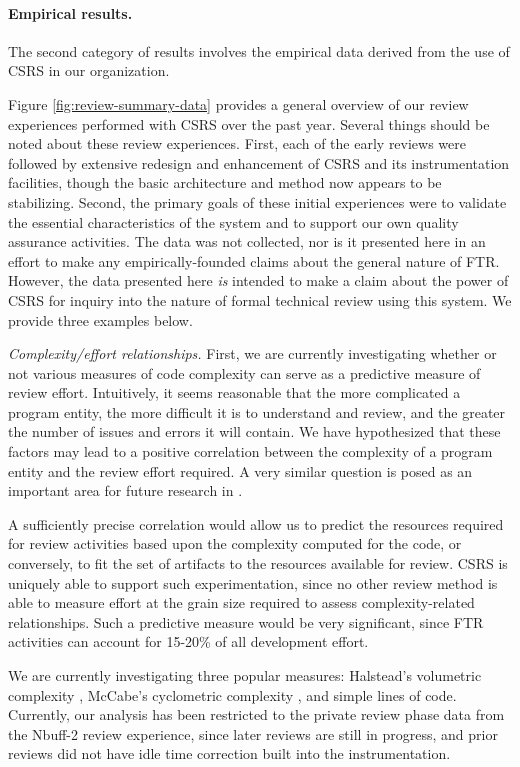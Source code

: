 \paragraph {Empirical results.}

The second category of results involves the empirical data derived from the
use of CSRS in our organization.  

Figure \ref{fig:review-summary-data} provides a general overview of our
review experiences performed with CSRS over the past year. Several things
should be noted about these review experiences. First, each of the early
reviews were followed by extensive redesign and enhancement of CSRS and its
instrumentation facilities, though the basic architecture and method now
appears to be stabilizing.  Second, the primary goals of these initial
experiences were to validate the essential characteristics of the system
and to support our own quality assurance activities.  The data was not
collected, nor is it presented here in an effort to make any
empirically-founded claims about the general nature of FTR.  However, the
data presented here {\em is}\/ intended to make a claim about the power of
CSRS for inquiry into the nature of formal technical review using this
system. We provide three examples below.

{\sl Complexity/effort relationships.} First, we are currently
investigating whether or not various measures of code complexity can serve
as a predictive measure of review effort.  Intuitively, it seems reasonable
that the more complicated a program entity, the more difficult it is to
understand and review, and the greater the number of issues and errors it
will contain.  We have hypothesized that these factors may lead to a
positive correlation between the complexity of a program entity and the
review effort required.  A very similar question is posed as an important
area for future research in \cite{Fagan86}.

A sufficiently precise correlation would allow us to predict the resources
required for review activities based upon the complexity computed for the
code, or conversely, to fit the set of artifacts to the resources available
for review.  CSRS is uniquely able to support such experimentation, since
no other review method is able to measure effort at the grain size required
to assess complexity-related relationships.  Such a predictive measure
would be very significant, since FTR activities can account for 15-20\% of
all development effort.

We are currently investigating three popular measures: Halstead's
volumetric complexity \cite{Halstead77}, McCabe's cyclometric complexity
\cite{McCabe76}, and simple lines of code. Currently, our analysis has been
restricted to the private review phase data from the Nbuff-2 review
experience, since later reviews are still in progress, and prior reviews
did not have idle time correction built into the instrumentation.

